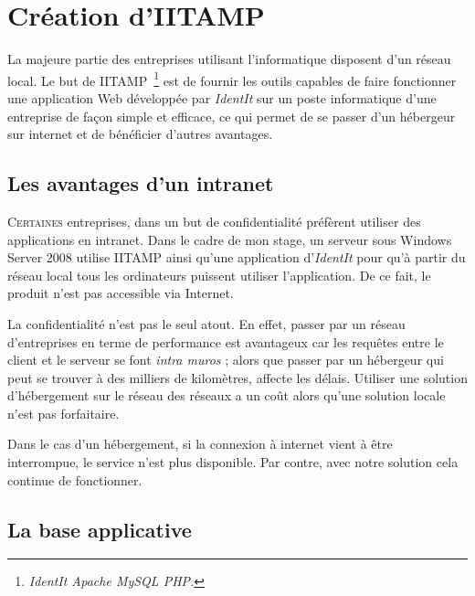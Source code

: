 \chapter{Création d'IITAMP} %
\label{cha:Création d'IITAMP}

\begin{it}

  La majeure partie des entreprises utilisant l'informatique disposent
  d'un réseau local. Le but de IITAMP\, \footnote{\emph{IdentIt Apache
  MySQL PHP.}} est de fournir les outils capables de faire fonctionner
  une application Web développée par \emph{IdentIt} sur un poste
  informatique d'une entreprise de façon simple et efficace, ce qui
  permet de se passer d'un hébergeur sur internet et de bénéficier
  d'autres avantages.

\end{it}

\section{Les avantages d'un intranet} %
\label{sec:Les avantages d'un intranet}

\lettrine{C}{ertaines} entreprises, dans un but de confidentialité
préfèrent utiliser des applications en intranet. Dans le cadre de mon
stage, un serveur sous Windows Server 2008 utilise IITAMP ainsi qu'une
application d'\emph{IdentIt} pour qu'à partir du réseau local tous les
ordinateurs puissent utiliser l'application. De ce fait, le produit
n'est pas accessible via Internet.

La confidentialité n'est pas le seul atout. En effet, passer par un
réseau d'entreprises en terme de performance est avantageux car les
requêtes entre le client et le serveur se font \emph{intra muros} ;
alors que passer par un hébergeur qui peut se trouver à des milliers de
kilomètres, affecte les délais. Utiliser une solution d'hébergement sur
le réseau des réseaux a un coût alors qu'une solution locale n'est pas
forfaitaire.

Dans le cas d'un hébergement, si la connexion à internet vient à être
interrompue, le service n'est plus disponible. Par contre, avec notre
solution cela continue de fonctionner.

\section{La base applicative} %
\label{sec:La base applicative}

